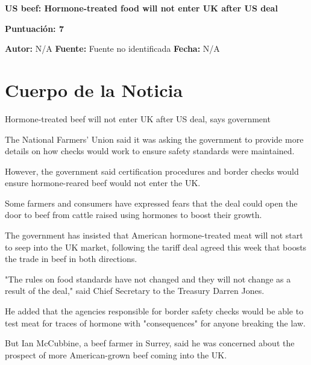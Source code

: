 \documentclass[10pt,a4paper]{article}
\begin{document}
\begin{center}
    {\Huge\bfseries US beef: Hormone-treated food will not enter UK after US deal\par}
    \vspace{0.5em}
    {\large\bfseries Puntuación: 7\par}
\end{center}
\vspace{1em}

\noindent\textbf{Autor:} N/A \hfill \textbf{Fuente:} Fuente no identificada \hfill \textbf{Fecha:} N/A\par
\vspace{1em}

\section*{Cuerpo de la Noticia}
\setlength{\parskip}{1em}
\setlength{\parindent}{0em}
Hormone-treated beef will not enter UK after US deal, says government
\par\medskip
The National Farmers' Union said it was asking the government to provide more details on how checks would work to ensure safety standards were maintained.
\par\medskip
However, the government said certification procedures and border checks would ensure hormone-reared beef would not enter the UK.
\par\medskip
Some farmers and consumers have expressed fears that the deal could open the door to beef from cattle raised using hormones to boost their growth.
\par\medskip
The government has insisted that American hormone-treated meat will not start to seep into the UK market, following the tariff deal agreed this week that boosts the trade in beef in both directions.
\par\medskip
"The rules on food standards have not changed and they will not change as a result of the deal," said Chief Secretary to the Treasury Darren Jones.
\par\medskip
He added that the agencies responsible for border safety checks would be able to test meat for traces of hormone with "consequences" for anyone breaking the law.
\par\medskip
But Ian McCubbine, a beef farmer in Surrey, said he was concerned about the prospect of more American-grown beef coming into the UK.
\par\medskip
\end{document}
